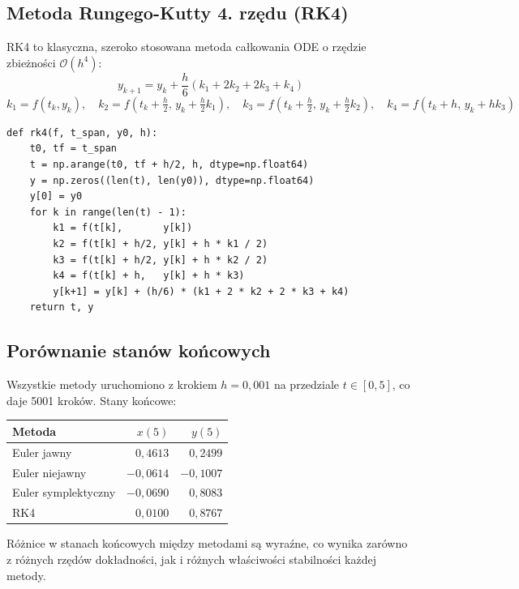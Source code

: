\documentclass[12pt, a4paper]{article}
\begin{document}
\subsection{Metoda Rungego-Kutty 4. rzędu (RK4)}

RK4 to klasyczna, szeroko stosowana metoda całkowania ODE o rzędzie zbieżności $\mathcal{O}(h^4)$:
\[
  y_{k+1} = y_k + \frac{h}{6}(k_1 + 2k_2 + 2k_3 + k_4)
\]
\[
  k_1 = f(t_k, y_k), \quad
  k_2 = f\!\left(t_k + \tfrac{h}{2},\, y_k + \tfrac{h}{2}k_1\right), \quad
  k_3 = f\!\left(t_k + \tfrac{h}{2},\, y_k + \tfrac{h}{2}k_2\right), \quad
  k_4 = f(t_k + h,\, y_k + hk_3)
\]

\begin{lstlisting}[caption={Implementacja metody RK4}]
def rk4(f, t_span, y0, h):
    t0, tf = t_span
    t = np.arange(t0, tf + h/2, h, dtype=np.float64)
    y = np.zeros((len(t), len(y0)), dtype=np.float64)
    y[0] = y0
    for k in range(len(t) - 1):
        k1 = f(t[k],       y[k])
        k2 = f(t[k] + h/2, y[k] + h * k1 / 2)
        k3 = f(t[k] + h/2, y[k] + h * k2 / 2)
        k4 = f(t[k] + h,   y[k] + h * k3)
        y[k+1] = y[k] + (h/6) * (k1 + 2 * k2 + 2 * k3 + k4)
    return t, y
\end{lstlisting}

\subsection{Porównanie stanów końcowych}

Wszystkie metody uruchomiono z krokiem $h = 0{,}001$ na przedziale $t \in [0, 5]$, co daje 5001 kroków. Stany końcowe:

\begin{center}
\begin{tabular}{lrr}
\toprule
Metoda & $x(5)$ & $y(5)$ \\
\midrule
Euler jawny         & $0{,}4613$  & $0{,}2499$  \\
Euler niejawny      & $-0{,}0614$ & $-0{,}1007$ \\
Euler symplektyczny & $-0{,}0690$ & $0{,}8083$  \\
RK4                 & $0{,}0100$  & $0{,}8767$  \\
\bottomrule
\end{tabular}
\end{center}

Różnice w stanach końcowych między metodami są wyraźne, co wynika zarówno z różnych rzędów dokładności, jak i różnych właściwości stabilności każdej metody.
\end{document}
